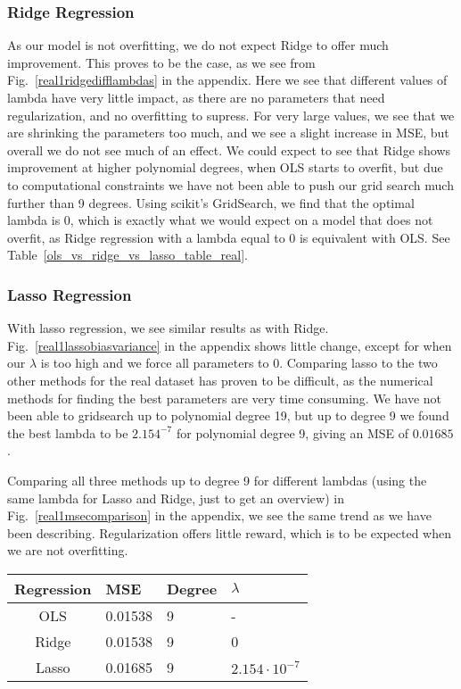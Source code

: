 \documentclass[onecolumn,10pt,cleanfoot]{asme2ej}
\begin{document}
\subsubsection{Ridge Regression}

As our model is not overfitting, we do not expect Ridge to offer much improvement. This proves to be the case, as we see from Fig.~\ref{real1ridgedifflambdas} in the appendix. Here we see that different values of lambda have very little impact, as there are no parameters that need regularization, and no overfitting to supress. For very large values, we see that we are shrinking the parameters too much, and we see a slight increase in MSE, but overall we do not see much of an effect. We could expect to see that Ridge shows improvement at higher polynomial degrees, when OLS starts to overfit, but due to computational constraints we have not been able to push our grid search much further than 9 degrees. Using scikit's GridSearch, we find that the optimal lambda is 0, which is exactly what we would expect on a model that does not overfit, as Ridge regression with a lambda equal to 0 is equivalent with OLS. See Table~\ref{ols_vs_ridge_vs_lasso_table_real}.

\subsubsection{Lasso Regression}

With lasso regression, we see similar results as with Ridge. Fig.~\ref{real1lassobiasvariance} in the appendix shows little change, except for when our $\lambda$ is too high and we force all parameters to $0$. Comparing lasso to the two other methods for the real dataset has proven to be difficult, as the numerical methods for finding the best parameters are very time consuming. We have not been able to gridsearch up to polynomial degree 19, but up to degree 9 we found the best lambda to be $2.154^{-7}$ for polynomial degree 9, giving an MSE of $0.01685$.

Comparing all three methods up to degree 9 for different lambdas (using the same lambda for Lasso and Ridge, just to get an overview) in Fig.~\ref{real1msecomparison} in the appendix, we see the same trend as we have been describing. Regularization offers little reward, which is to be expected when we are not overfitting.


\begin{table*}[t]
\caption{Best MSE for OLS, Ridge and Lasso regression on real elevation data. We only fit up to degree 9 due to computational constraints}
\begin{center}
\label{ols_vs_ridge_vs_lasso_table_real}
\begin{tabular}{c | l l l}
Regression & MSE & Degree & $\lambda$ \\
\hline
OLS & 0.01538 & 9 & - \\
Ridge & 0.01538 & 9 & 0 \\
Lasso & 0.01685 & 9 & $2.154 \cdot 10^{-7}$ \\
\hline
\end{tabular}
\end{center}
\end{table*}
\end{document}
